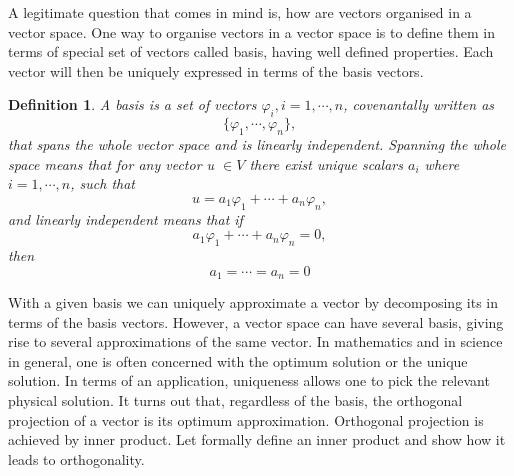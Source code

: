 \documentclass[11pt, oneside]{article}   	%
\newtheorem{definition}{Definition}
\begin{document}
A legitimate question that comes in mind is, how are vectors organised in a vector space. One way to organise vectors in a vector space is to define them in terms of special set of vectors called basis, having well defined properties. Each vector will then be uniquely expressed in terms of the basis vectors. 
\justify
\begin{definition}
A basis is a set of vectors $\varphi_{i}, i = 1, \cdots, n$, covenantally written as 
\begin{equation}
\{ \varphi_{1}, \cdots, \varphi_{n} \} \nonumber,
\end{equation}
that spans the whole vector space and is linearly independent. Spanning the whole space means that for any vector u $\in V$ there exist unique scalars $a_{i}$ where $i=1,\cdots,n$, such that 
\begin{equation}
u = a_{1}\varphi_{1} + \cdots + a_{n}\varphi_{n} \nonumber,
\end{equation}
and linearly independent means that if
\begin{equation}
a_{1}\varphi_{1} + \cdots + a_{n}\varphi_{n} = 0 \nonumber,
\end{equation}
then 
\begin{equation}
a_{1} = \cdots = a_{n} = 0 \nonumber
\end{equation}
\end{definition}
\justify
With a given basis we can uniquely approximate a vector by decomposing its in terms of the basis vectors. However, a vector space can have several basis, giving rise to several approximations of the same vector. In mathematics and in science in general, one is often concerned with the optimum solution or the unique solution. In terms of an application, uniqueness allows one to pick the relevant physical solution.
It turns out that, regardless of the basis, the orthogonal projection of a vector is its optimum approximation. Orthogonal projection is achieved by inner product. Let formally define an inner product and show how it leads to orthogonality.
\end{document}
